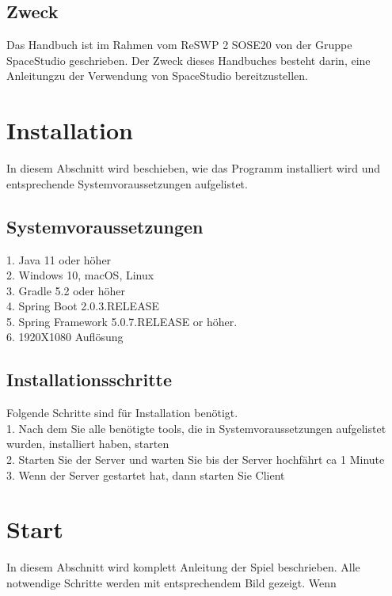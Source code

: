 \documentclass[fontsize=12pt,paper=a4,twoside]{scrartcl}
\begin{document}
\subsection{Zweck}

Das Handbuch ist im Rahmen vom ReSWP 2 SOSE20 von der Gruppe SpaceStudio geschrieben. Der Zweck dieses Handbuches besteht darin, eine Anleitungzu der Verwendung von SpaceStudio bereitzustellen.


\section{Installation}
In diesem Abschnitt wird beschieben, wie das Programm installiert wird und entsprechende Systemvoraussetzungen aufgelistet.

\subsection{Systemvoraussetzungen}
1. Java 11 oder höher \\
2. Windows 10, macOS, Linux \\
3. Gradle 5.2 oder höher \\
4. Spring Boot 2.0.3.RELEASE \\
5.  Spring Framework 5.0.7.RELEASE or höher. \\
6. 1920X1080 Auflösung
 

\subsection{Installationsschritte}
Folgende  Schritte sind für Installation benötigt. \\
1. Nach dem Sie alle benötigte tools, die in Systemvoraussetzungen aufgelistet wurden, installiert haben, starten \\
2. Starten Sie der Server und warten Sie bis der Server hochfährt ca 1 Minute\\
3. Wenn der Server gestartet hat, dann starten Sie Client

 



\section{Start}
In diesem Abschnitt wird komplett Anleitung der Spiel beschrieben. Alle notwendige Schritte werden mit entsprechendem Bild gezeigt. Wenn 
\end{document}
